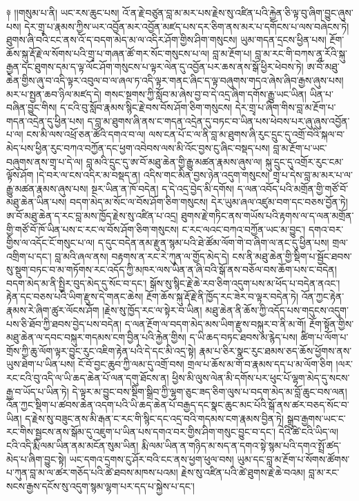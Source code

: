 \documentclass{article}
\begin{document}
༈ །།གསུམ་པ་ནི། ཡང་རས་ཆུང་པས། འོ་ན་རྗེ་བཙུན་བླ་མ་མར་པས་རྗེས་སུ་འཛིན་པའི་རྐྱེན་ཅི་ལྟ་བུ་ཞིག་བྱུང་ཞུས་པས། དེར་གྲྭ་པ་རྣམས་ཀྱིས་ཡར་འབྱོན་མར་འབྱོན་མཛད་པས་དར་ཅིག་ནས་མར་པ་དགོངས་པ་ལས་བཞེངས་ཏེ། ཐུགས་ཞི་བའི་ངང་ནས་འོ་ད་བདག་མེད་མ་ལ་འདིར་ཤོག་གྱིས་ཤིག་གསུངས། ཡུམ་གདན་དྲངས་ཕྱིན་པས། རྔོག་ཆོས་སྐུ་རྡོ་རྗེ་ལ་སོགས་པའི་གྲྭ་པ་གཞན་ཚོ་གར་སོང་གསུངས་པ་ལ། བླ་མ་རྔོག་པ། བླ་མ་རང་གི་བཀས་ནཱ་རོའི་སྐུ་རྒྱན་དང་ཐུགས་དམ་ད་ལྟ་ལོང་ཤོག་གསུངས་པ་ལྟར་ལེན་དུ་འབྱོན་པར་ཆས་ནས་སྒོ་ཕྱིར་ཕེབས་ཏེ། ཨ་བོ་མཐུ་ཆེན་གྱིས་ཞུ་བ་འདི་ལྟར་འབུལ་བ་ལ་ཞལ་ཏ་འདི་ལྟར་གནང་ཞིང་ད་ལྟ་བཞུགས་གདའ་ཞེས་ཞིབ་རྒྱས་ཞུས་པས། མར་པ་སྤྱན་ཆབ་ཉིལ་མཛད་དེ། གསང་སྔགས་ཀྱི་སློབ་མ་ཞེས་བྱ་བ་དེ་འདྲ་ཞིག་དགོས་རྒྱུ་ཡང་ཡིན། ཡིན་པ་བཞིན་བྱུང་གིས། ད་ངའི་བུ་སློབ་རྣམས་སྙིང་རྗེ་བས་བོས་ཤོག་ཅིག་གསུངས། དེར་གྲྭ་པ་ཞིག་གིས་བླ་མ་རྔོག་པ་གདན་འདྲེན་དུ་ཕྱིན་པས། ད་བླ་མ་ཐུགས་ཞི་ནས་ང་གདན་འདྲེན་དུ་བཏང་བ་ཡིན་པས་ཕེབས་པར་ཞུ་ཞུས་འབྱོན་པ་ལ། ངས་མི་ལས་འཕྲོ་ཅན་ཚོའི་དགའ་བ་ལ། ལས་ངན་པོ་ང་ལ་ནི་བླ་མ་ཐུགས་ཞི་རུང་དྲུང་དུ་འགྲོ་བའི་སྐལ་བ་མེད་པས་ཕྱིན་རུང་བཀའ་བཀྱོན་དང་ཕྱག་འབེབས་ལས་མི་འོང་བྱས་ངུ་ཞིང་བསྡད་པས། བླ་མ་རྔོག་པ་ཡང་བཞུགས་ནས་གྲྭ་པ་དེ་ལ། བླ་མའི་དྲུང་དུ་ཨ་བོ་མཐུ་ཆེན་གྱི་རྒྱུ་མཚན་རྣམས་ཞུས་ལ། སྐུ་དྲུང་དུ་འགྲོར་རུང་ངམ་ལྟོས་ཤོག །དེ་བར་ལ་ངས་འདིར་མ་བསྡད་ན། འདིས་གང་མིན་བྱས་ཉེན་འདུག་གསུངས། གྲྭ་པ་དེས་བླ་མ་མར་པ་ལ་རྒྱུ་མཚན་རྣམས་ཞུས་པས། སྔར་ཡིན་ན་ཁོ་བདེན། ད་དེ་འདྲ་བྱེད་མི་དགོས། ད་ལན་འབོད་པའི་མགྲོན་གྱི་གཙོ་བོ་མཐུ་ཆེན་ཡིན་པས། བདག་མེད་མ་སོང་ལ་བོས་ཤོག་ཅིག་གསུངས། དེར་ཡུམ་ཞལ་འཛུམ་བག་དང་བཅས་བྱོན་ཏེ། ཨ་བོ་མཐུ་ཆེན་ད་རང་བླ་མས་ཁྱོད་རྗེས་སུ་འཛིན་པ་འདྲ། ཐུགས་རྗེ་གཏིང་ནས་གཡོས་པའི་རྟགས་ལ་ད་ལན་མགྲོན་གྱི་གཙོ་བོ་ཁོ་ཡིན་པས་ང་རང་ལ་བོས་ཤོག་ཅིག་གསུངས། ང་རང་ལའང་བཀའ་བཀྱོན་ཡང་མ་བྱུང་། དགའ་བར་གྱིས་ལ་འདོང་ངོ་གསུང་པ་ལ། ད་དུང་བདེན་ནམ་རྫུན་སྙམ་པའི་ཐེ་ཚོམ་ལོག་གེ་བ་ཞིག་ལ་ནང་དུ་ཕྱིན་པས། གྲལ་འགྲིག་པ་དང་། བླ་མའི་ཞལ་ནས། བརྟགས་ན་རང་རེ་ཀུན་ལ་གྱོད་མེད་དེ། ངས་ནི་མཐུ་ཆེན་གྱི་སྡིག་པ་སྦྱོང་ཐབས་སུ་སྡུག་བཏང་བ་མ་གཏོགས་རང་འདོད་ཀྱི་མཁར་ལས་ཡིན་ན་ཞི་བའི་སྒོ་ནས་བཅོལ་བས་ཆོག་པས་ང་བདེན། བདག་མེད་མ་ནི་སྤྱིར་བུད་མེད་དུ་སོང་བ་དང་། སྒོས་སུ་སྙིང་རྗེ་ཆེ་རབ་ཅིག་འདུག་པས་མ་ཕོད་པ་བདེན་ནའང་། རྟེན་དང་བཅས་པའི་ཡིག་རྫུས་དེ་གནང་ཆེས། རྔོག་ཆོས་སྐུ་རྡོ་རྗེ་ནི་ཁྱོད་རང་ཟེར་བ་ལྟར་བདེན་ཏེ། འོན་ཀྱང་རྟེན་རྣམས་རེ་ཞིག་ཚུར་ལོངས་ཤོག །རྗེས་སུ་ཁྱོད་རང་ལ་སྟེར་བ་ཡིན། མཐུ་ཆེན་ནི་ཆོས་ཀྱི་འདོད་པས་གདུངས་འདུག་པས་ཅི་ཐོབ་ཀྱི་ཐབས་བྱེད་པས་བདེན། ད་ལན་རྔོག་ལ་བདག་མེད་མས་ཡིག་རྫུས་བསྐུར་བ་ནི་མ་གོ། རྔོག་སྟོན་གྱིས་མཐུ་ཆེན་ལ་དབང་བསྐུར་གདམས་ངག་བྱིན་པའི་རྐྱེན་གྱིས། ད་ཡི་ཆད་བཏང་ཐབས་མ་རྙེད་པས། ཚིག་པ་ལོག་པ་གྲོས་ཀྱི་ཆུ་ལོག་ལྟར་བྱུང་རུང་འཇིག་རྟེན་པའི་དེ་དང་མི་འདྲ་སྟེ། རྣམ་པ་ཅིར་སྣང་རུང་ཐམས་ཅད་ཆོས་ཕྱོགས་ནས་ཡུས་ཐེག་པ་ཡིན་པས། ངོ་བོ་བྱང་ཆུབ་ཀྱི་ལམ་དུ་འགྲོ་བས། གྲལ་པ་ཆོས་མ་གོ་བ་རྣམས་དད་པ་མ་ལོག་ཅིག །ལར་རང་ངའི་བུ་འདི་ལ་ཡི་ཆད་ཆེན་པོ་ལན་དགུ་ཐོངས་ན། ཕྱིས་མི་ལུས་ལེན་མི་དགོས་པར་ཕུང་པོ་ལྷག་མེད་དུ་སངས་རྒྱ་བ་ཡོད་པ་ཡིན་ཏེ། དེ་ལྟར་མ་བྱུང་བས་སྡིག་སྒྲིབ་ཀྱི་ལྷག་ཅུང་ཟད་ཅིག་ལུས་པ་བདག་མེད་མ་བློ་ཆུང་བས་ལན། འོན་ཀྱང་སྡིག་པ་ཚབས་ཆེན་འདག་པའི་ཡི་ཆད་ཆེན་པོ་བརྒྱད་དང་སྣང་ཆུང་མང་པོའི་སྒོ་ནས་ཚར་བཅད་སོང་བ་ཡིན། ད་རྗེས་སུ་བཟུང་ནས་མི་རྒན་ང་རང་གི་སྙིང་དང་འདྲ་བའི་གདམས་ངག་རྣམས་བྱིན་ཏེ། སྒྲུབ་རྒྱགས་ཡང་ང་རང་གིས་སྦྱངས་ནས་སྒོམ་དུ་འཇུག་པ་ཡིན་པས་དགའ་བར་གྱིས་ཤིག་གསུང་བྱུང་བ་དང་། དེའི་ཚེ་ངའི་ཡིད་ལ། ངའི་འདི་རྨི་ལམ་ཡིན་ནམ་མངོན་སུམ་ཡིན། རྨི་ལམ་ཡིན་ན་གཉིད་མ་སད་ན་དགའ་སྟེ་སྙམ་པའི་དགའ་སྤྲོ་ཚད་མེད་པ་ཞིག་བྱུང་སྟེ། ཡང་དགའ་དྲགས་ངུ་ཤོར་བའི་ངང་ནས་ཕྱག་ཕུལ་བས། ཡུམ་དང་བླ་མ་རྔོག་པ་སོགས་ཚོགས་པ་ཀུན་བླ་མ་ལ་ཚར་གཅོད་པའི་ཚེ་ཐབས་མཁས་པའམ། རྗེས་སུ་འཛིན་པའི་ཚེ་ཐུགས་རྗེ་ཆེ་བའམ། བླ་མ་རང་སངས་རྒྱས་དངོས་སུ་འདུག་སྙམ་ལྷག་པར་དད་པ་སྐྱེས་པ་དང་། 
\end{document}
